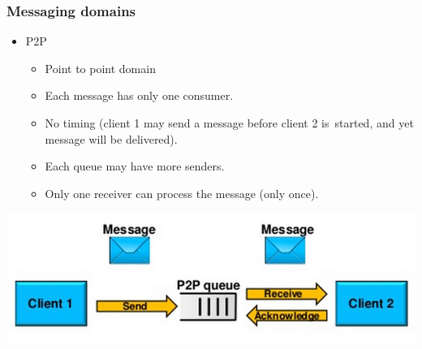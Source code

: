 \documentclass[10pt,xcolor=pdflatex]{beamer}
\begin{document}
\begin{frame}[containsverbatim]\frametitle{Messaging domains}
\begin{itemize}
	\item P2P
	  \begin{itemize}
		\item Point to point domain
		\item Each message has only one consumer.
		\item No timing (client 1 may send a message before client 2 is~started, and yet message will be delivered).
		\item Each queue may have more senders.
        \item Only one receiver can process the message (only once).
	  \end{itemize}
\end{itemize}
\begin{center}
\includegraphics[scale=0.55]{img/obr2}
\end{center}
\end{frame}
\end{document}
